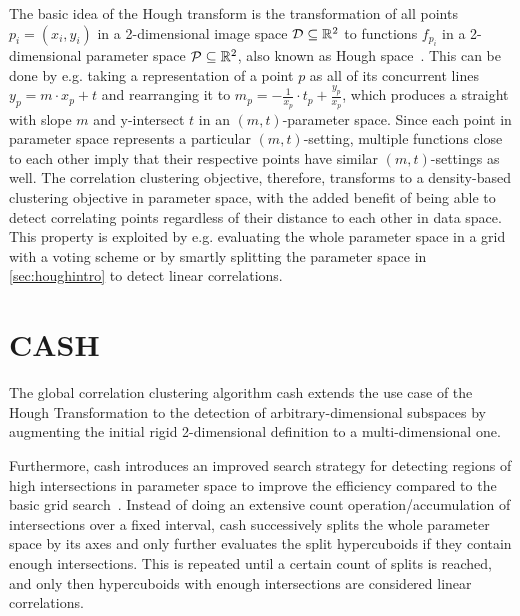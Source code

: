 The basic idea of the Hough transform is the transformation of all points $p_i = (x_i,y_i)$ in a 2-dimensional image space $\mathcal{D} \subseteq \mathbb{R}^2$ to functions $f_{p_i}$ in a 2-dimensional parameter space $\mathcal{P} \subseteq \mathbb{R}^2$, also known as Hough space~\cite{illingworth1988survey}. This can be done by e.g. taking a representation of a point $p$ as all of its concurrent lines $y_p = m \cdot x_p + t$ and rearranging it to $m_{p} = - \frac{1}{x_p} \cdot t_{p} + \frac{y_p}{x_p}$, which produces a straight with slope $m$ and y-intersect $t$ in an $(m,t)$-parameter space. Since each point in parameter space represents a particular $(m,t)$-setting, multiple functions close to each other imply that their respective points have similar $(m,t)$-settings as well. The correlation clustering objective, therefore, transforms to a density-based clustering objective in parameter space, with the added benefit of being able to detect correlating points regardless of their distance to each other in data space. This property is exploited by e.g. evaluating the whole parameter space in a grid with a voting scheme or by smartly splitting the parameter space in \autoref{sec:houghintro} to detect linear correlations. 

\section{CASH}\label{sec:cashintro}
The global correlation clustering algorithm \gls{cash} extends the use case of the Hough Transformation to the detection of arbitrary-dimensional subspaces by augmenting the initial rigid 2-dimensional definition to a multi-dimensional one. 

Furthermore, \gls{cash} introduces an improved search strategy for detecting regions of high intersections in parameter space to improve the efficiency compared to the basic grid search~\cite{CASHachtert2008global}. Instead of doing an extensive count operation/accumulation of intersections over a fixed interval, \gls{cash} successively splits the whole parameter space by its axes and only further evaluates the split hypercuboids if they contain enough intersections. This is repeated until a certain count of splits is reached, and only then hypercuboids with enough intersections are considered linear correlations. 

